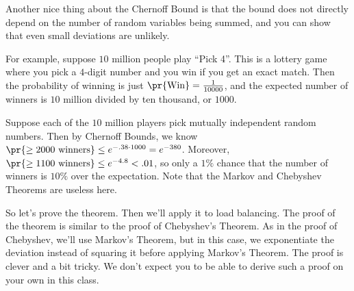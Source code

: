 Another nice thing about the Chernoff Bound is that the bound does not directly depend on the number of random variables being summed, and you can show that even small deviations are unlikely. 

For example, suppose $10$ million people play ``Pick 4''. This is a lottery game where you pick a $4$-digit number and you win if you get an exact match. Then the probability of winning is just $\pr{\textrm{Win}} = \frac{1}{10000}$, and the expected number of winners is $10$ million divided by ten thousand, or $1000$. 

Suppose each of the $10$ million players pick mutually independent random numbers. Then by Chernoff Bounds, we know $\pr{\geq 2000 \textrm{ winners}} \leq e^{-.38 \cdot 1000} = e^{-380}$. Moreover, $\pr{\geq 1100 \textrm{ winners}} \leq e^{-4.8} < .01$, so only a $1\%$ chance that the number of winners is $10\%$ over the expectation. Note that the Markov and Chebyshev Theorems are useless here. 

So let's prove the theorem. Then we'll apply it to load balancing. The proof of the theorem is similar to the proof of Chebyshev's Theorem. As in the proof of Chebyshev, we'll use Markov's Theorem, but in this case, we exponentiate the deviation instead of squaring it before applying Markov's Theorem. The proof is clever and a bit tricky. We don't expect you to be able to derive such a proof on your own in this class.

